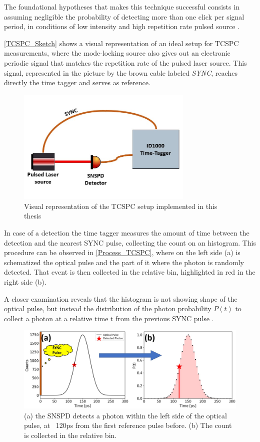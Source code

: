 The foundational hypotheses that makes this technique successful consists in assuming negligible the probability of detecting more than one click per signal period, in conditions of low intensity and high repetition rate pulsed source \cite{TCSPC_Bible}.

\autoref{TCSPC_Sketch} shows a visual representation of an ideal setup for TCSPC measurements, where the mode-locking source also gives out an electronic periodic signal that matches the repetition rate of the pulsed laser source. This signal, represented in the picture by the brown cable labeled \emph{SYNC}, reaches directly the time tagger and serves as reference.
\begin{figure}[hbtp]
\centering
\includegraphics[width=0.75\textwidth]{TCSPC_sketch}
\caption{Visual representation of the TCSPC setup implemented in this thesis}
\label{TCSPC_Sketch}
\end{figure}

In case of a detection the time tagger measures the amount of time between the detection and the nearest SYNC pulse, collecting the count on an histogram.
This procedure can be observed in \autoref{Process_TCSPC}, where on the left side (a) is schematized the optical pulse and the part of it where the photon is randomly detected. That event is then collected in the relative bin, highlighted in red in the right side (b). 

A closer examination reveals that the histogram is not showing shape of the optical pulse, but instead the distribution of the photon probability $P(t)$ to collect a photon at a relative time t from the previous SYNC pulse \cite{TCSPC_Bible}.

\begin{figure}[hbtp]
\centering
\includegraphics[width=1\textwidth]{TCSPC_Pulse_to_Hist2.jpg}
\caption{(a) the SNSPD detects a photon within the left side of the optical pulse, at ~120ps from the first reference pulse before. (b) The count is collected in the relative bin.}
\label{Process_TCSPC}
\end{figure}

